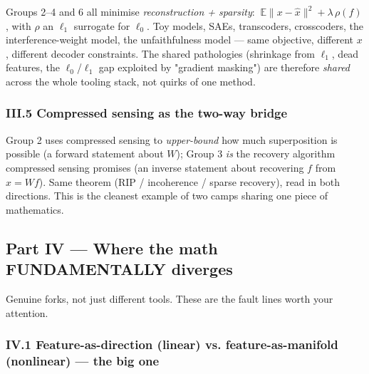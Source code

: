 Groups 2--4 and 6 all minimise \emph{reconstruction + sparsity}: $\ \mathbb{E}\|x-\hat x\|^2 + \lambda\,\rho(f)$, with $\rho$ an $\ell_1$ surrogate for $\ell_0$. Toy models, SAEs, transcoders, crosscoders, the interference-weight model, the unfaithfulness model --- same objective, different $x$, different decoder constraints. The shared pathologies (shrinkage from $\ell_1$, dead features, the $\ell_0$/$\ell_1$ gap exploited by "gradient masking") are therefore \emph{shared} across the whole tooling stack, not quirks of one method.


\subsubsection*{III.5 Compressed sensing as the two-way bridge}

Group 2 uses compressed sensing to \emph{upper-bound} how much superposition is possible (a forward statement about $W$); Group 3 \emph{is} the recovery algorithm compressed sensing promises (an inverse statement about recovering $f$ from $x=Wf$). Same theorem (RIP / incoherence / sparse recovery), read in both directions. This is the cleanest example of two camps sharing one piece of mathematics.



\subsection*{Part IV --- Where the math FUNDAMENTALLY diverges}

Genuine forks, not just different tools. These are the fault lines worth your attention.


\subsubsection*{IV.1 Feature-as-direction (linear) vs. feature-as-manifold (nonlinear) --- the big one}

